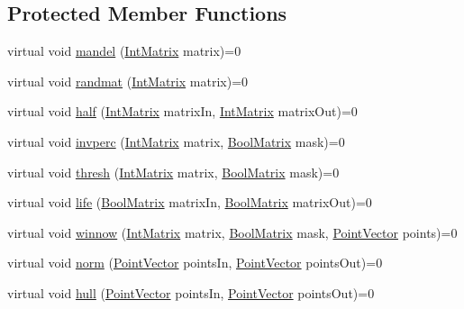 \subsection*{Protected Member Functions}
\begin{CompactItemize}
\item 
virtual void \hyperlink{class_cowichan_ec6cc4eb2ad444474b923532167e98a2}{mandel} (\hyperlink{cowichan_8hpp_82321152ddeeefe9c61350a42ed9e7af}{IntMatrix} matrix)=0
\item 
virtual void \hyperlink{class_cowichan_c44cacf9d9e363a5b076bcee8b9a7a73}{randmat} (\hyperlink{cowichan_8hpp_82321152ddeeefe9c61350a42ed9e7af}{IntMatrix} matrix)=0
\item 
virtual void \hyperlink{class_cowichan_308603053675bccbe631f04af921f57c}{half} (\hyperlink{cowichan_8hpp_82321152ddeeefe9c61350a42ed9e7af}{IntMatrix} matrixIn, \hyperlink{cowichan_8hpp_82321152ddeeefe9c61350a42ed9e7af}{IntMatrix} matrixOut)=0
\item 
virtual void \hyperlink{class_cowichan_ea126792a31e54a8722663b7ea768955}{invperc} (\hyperlink{cowichan_8hpp_82321152ddeeefe9c61350a42ed9e7af}{IntMatrix} matrix, \hyperlink{cowichan_8hpp_a64c8df2f1e9c8ea68a7bcc19aca683e}{BoolMatrix} mask)=0
\item 
virtual void \hyperlink{class_cowichan_a0b633b8c1f21884e0998a9c7020c08c}{thresh} (\hyperlink{cowichan_8hpp_82321152ddeeefe9c61350a42ed9e7af}{IntMatrix} matrix, \hyperlink{cowichan_8hpp_a64c8df2f1e9c8ea68a7bcc19aca683e}{BoolMatrix} mask)=0
\item 
virtual void \hyperlink{class_cowichan_d449595ef2fe934bdd128ac8b1f51d07}{life} (\hyperlink{cowichan_8hpp_a64c8df2f1e9c8ea68a7bcc19aca683e}{BoolMatrix} matrixIn, \hyperlink{cowichan_8hpp_a64c8df2f1e9c8ea68a7bcc19aca683e}{BoolMatrix} matrixOut)=0
\item 
virtual void \hyperlink{class_cowichan_13d60e06ced3b5da79d62c133ce82337}{winnow} (\hyperlink{cowichan_8hpp_82321152ddeeefe9c61350a42ed9e7af}{IntMatrix} matrix, \hyperlink{cowichan_8hpp_a64c8df2f1e9c8ea68a7bcc19aca683e}{BoolMatrix} mask, \hyperlink{class_point}{PointVector} points)=0
\item 
virtual void \hyperlink{class_cowichan_3df21e3c627958114e045c3559a29f30}{norm} (\hyperlink{class_point}{PointVector} pointsIn, \hyperlink{class_point}{PointVector} pointsOut)=0
\item 
virtual void \hyperlink{class_cowichan_0c6b68ae3c059b66893405f8530a2e0a}{hull} (\hyperlink{class_point}{PointVector} pointsIn, \hyperlink{class_point}{PointVector} pointsOut)=0

\end{CompactItemize}
